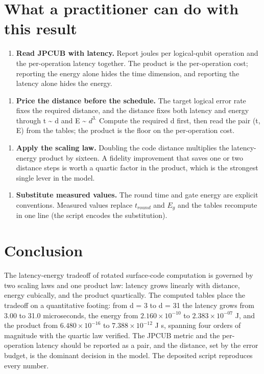 \documentclass[11pt]{article}
\begin{document}
\section{What a practitioner can do with this result}
\begin{enumerate}
  \item \textbf{Read JPCUB with latency.} Report joules per logical-qubit operation and the per-operation latency together. The product is the per-operation cost; reporting the energy alone hides the time dimension, and reporting the latency alone hides the energy.
\end{enumerate}
\begin{enumerate}
  \item \textbf{Price the distance before the schedule.} The target logical error rate fixes the required distance, and the distance fixes both latency and energy through t \textasciitilde{} d and E \textasciitilde{} $d^{3.}$ Compute the required d first, then read the pair (t, E) from the tables; the product is the floor on the per-operation cost.
\end{enumerate}
\begin{enumerate}
  \item \textbf{Apply the scaling law.} Doubling the code distance multiplies the latency-energy product by sixteen. A fidelity improvement that saves one or two distance steps is worth a quartic factor in the product, which is the strongest single lever in the model.
\end{enumerate}
\begin{enumerate}
  \item \textbf{Substitute measured values.} The round time and gate energy are explicit conventions. Measured values replace $t_{round}$ and $E_{g}$ and the tables recompute in one line (the script encodes the substitution).
\end{enumerate}
\section{Conclusion}
The latency-energy tradeoff of rotated surface-code computation is governed by two scaling laws and one product law: latency grows linearly with distance, energy cubically, and the product quartically. The computed tables place the tradeoff on a quantitative footing: from d = 3 to d = 31 the latency grows from 3.00 to 31.0 microseconds, the energy from $2.160\times 10^{-10}$ to $2.383\times 10^{-07}$ J, and the product from $6.480\times 10^{-16}$ to $7.388\times 10^{-12}$ J s, spanning four orders of magnitude with the quartic law verified. The JPCUB metric and the per-operation latency should be reported as a pair, and the distance, set by the error budget, is the dominant decision in the model. The deposited script reproduces every number.
\end{document}

